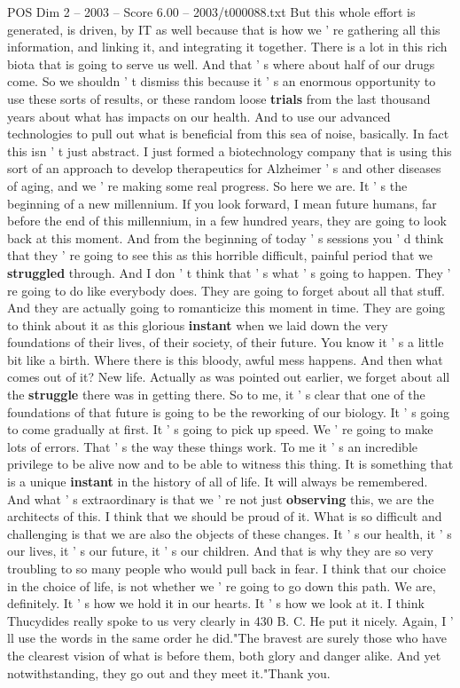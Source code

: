\begin{textsample}{POS Dim 2 – 2003 – Score 6.00 – 2003/t000088.txt}
But this whole effort is generated, is driven, by IT as well because that is how we ' re gathering all this information, and linking it, and integrating it together.
There is a lot in this rich biota that is going to serve us well.
And that ' s where about half of our drugs come.
So we shouldn ' t dismiss this because it ' s an enormous opportunity to use these sorts of results, or these random loose \textbf{trials} from the last thousand years about what has impacts on our health.
And to use our advanced technologies to pull out what is beneficial from this sea of noise, basically.
In fact this isn ' t just abstract.
I just formed a biotechnology company that is using this sort of an approach to develop therapeutics for Alzheimer ' s and other diseases of aging, and we ' re making some real progress.
So here we are.
It ' s the beginning of a new millennium.
If you look forward, I mean future humans, far before the end of this millennium, in a few hundred years, they are going to look back at this moment.
And from the beginning of today ' s sessions you ' d think that they ' re going to see this as this horrible difficult, painful period that we \textbf{struggled} through.
And I don ' t think that ' s what ' s going to happen.
They ' re going to do like everybody does.
They are going to forget about all that stuff.
And they are actually going to romanticize this moment in time.
They are going to think about it as this glorious \textbf{instant} when we laid down the very foundations of their lives, of their society, of their future.
You know it ' s a little bit like a birth.
Where there is this bloody, awful mess happens.
And then what comes out of it?
New life.
Actually as was pointed out earlier, we forget about all the \textbf{struggle} there was in getting there.
So to me, it ' s clear that one of the foundations of that future is going to be the reworking of our biology.
It ' s going to come gradually at first.
It ' s going to pick up speed.
We ' re going to make lots of errors.
That ' s the way these things work.
To me it ' s an incredible privilege to be alive now and to be able to witness this thing.
It is something that is a unique \textbf{instant} in the history of all of life.
It will always be remembered.
And what ' s extraordinary is that we ' re not just \textbf{observing} this, we are the architects of this.
I think that we should be proud of it.
What is so difficult and challenging is that we are also the objects of these changes.
It ' s our health, it ' s our lives, it ' s our future, it ' s our children.
And that is why they are so very troubling to so many people who would pull back in fear.
I think that our choice in the choice of life, is not whether we ' re going to go down this path.
We are, definitely.
It ' s how we hold it in our hearts.
It ' s how we look at it.
I think Thucydides really spoke to us very clearly in 430 B.
C.
He put it nicely.
Again, I ' ll use the words in the same order he did."The bravest are surely those who have the clearest vision of what is before them, both glory and danger alike.
And yet notwithstanding, they go out and they meet it."Thank you.

\end{textsample}
